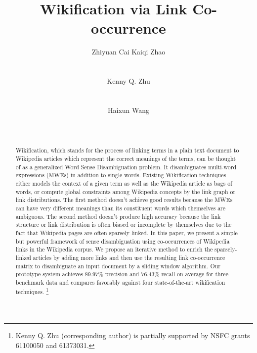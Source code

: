 \documentclass{sig-alternate}%
\begin{document}
\title{Wikification via Link Co-occurrence}

\author{%
\alignauthor
Zhiyuan Cai \hspace*{3mm} Kaiqi Zhao\\
	\\
	\\
\alignauthor
Kenny Q. Zhu\\
	\\
	\\
\alignauthor
Haixun Wang\\
	\\
	\\
}
\maketitle

\begin{abstract}
Wikification, which stands for the process of linking terms in a
plain text document to Wikipedia articles which represent the correct
meanings of the terms, can be thought
of as a generalized Word Sense Disambiguation problem.
It disambiguates multi-word expressions (MWEs) in addition to single words.
Existing Wikification techniques either models the context of a given
term as well as the Wikipedia article as bags of words, or compute
global constraints among Wikipedia concepts by the link graph or
link distributions. The first method doesn't achieve good results
because the MWEs can have very different meanings than its constituent
words which themselves are ambiguous. The second method doesn't produce
high accuracy because the link structure or link distribution is often
biased or incomplete by themselves due to the fact that Wikipedia pages
are often sparsely linked.
In this paper, we present a simple but powerful framework
of sense disambiguation
using co-occurrences of Wikipedia links in the Wikipedia
corpus. We propose an iterative method to enrich the sparsely-linked
articles by adding more links and then use the resulting
link co-occurrence matrix to disambiguate an input document by a sliding
window algorithm.  Our prototype system achieves 89.97\% precision
and 76.43\% recall on average for three benchmark data and
compares favorably against four state-of-the-art wikification techniques.
\footnote{Kenny Q. Zhu (corresponding author) is partially
supported by NSFC grants 61100050 and 61373031.}
\end{abstract}
\end{document}
